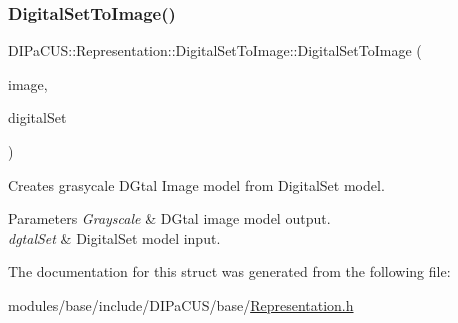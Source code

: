 \subsubsection{\texorpdfstring{Digital\+Set\+To\+Image()}{DigitalSetToImage()}}
{\footnotesize\ttfamily D\+I\+Pa\+C\+U\+S\+::\+Representation\+::\+Digital\+Set\+To\+Image\+::\+Digital\+Set\+To\+Image (\begin{DoxyParamCaption}\item[{\mbox{\hyperlink{structDIPaCUS_1_1Representation_1_1DigitalSetToImage_a667d591846f9f83f57380ad2f9f179b0}{Image2D}} \&}]{image,  }\item[{const \mbox{\hyperlink{structDIPaCUS_1_1Representation_1_1DigitalSetToImage_af4d7e5b03eed41ad715ea9e7f1bdeef4}{Digital\+Set}} \&}]{digital\+Set }\end{DoxyParamCaption})}



Creates grasycale D\+Gtal Image model from Digital\+Set model. 


\begin{DoxyParams}{Parameters}
{\em Grayscale} & D\+Gtal image model output. \\
\hline
{\em dgtal\+Set} & Digital\+Set model input. \\
\hline
\end{DoxyParams}


The documentation for this struct was generated from the following file\+:\begin{DoxyCompactItemize}
\item 
modules/base/include/\+D\+I\+Pa\+C\+U\+S/base/\mbox{\hyperlink{Representation_8h}{Representation.\+h}}\end{DoxyCompactItemize}
